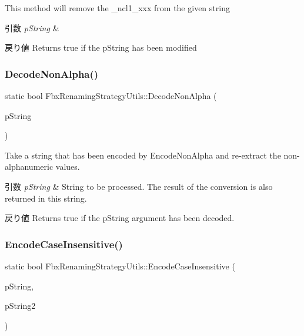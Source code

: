 This method will remove the \+\_\+ncl1\+\_\+xxx from the given string 
\begin{DoxyParams}{引数}
{\em p\+String} & \\
\hline
\end{DoxyParams}
\begin{DoxyReturn}{戻り値}
Returns true if the p\+String has been modified 
\end{DoxyReturn}
\mbox{\label{class_fbx_renaming_strategy_utils_a9ba422882bbd76f388037c75c06ff0e5}} 
\subsubsection{\texorpdfstring{Decode\+Non\+Alpha()}{DecodeNonAlpha()}}
{\footnotesize\ttfamily static bool Fbx\+Renaming\+Strategy\+Utils\+::\+Decode\+Non\+Alpha (\begin{DoxyParamCaption}\item[{\hyperlink{class_fbx_string}{Fbx\+String} \&}]{p\+String }\end{DoxyParamCaption})\hspace{0.3cm}{\ttfamily [static]}}

Take a string that has been encoded by Encode\+Non\+Alpha and re-\/extract the non-\/alphanumeric values. 
\begin{DoxyParams}{引数}
{\em p\+String} & String to be processed. The result of the conversion is also returned in this string. \\
\hline
\end{DoxyParams}
\begin{DoxyReturn}{戻り値}
Returns {\ttfamily true} if the {\ttfamily p\+String} argument has been decoded. 
\end{DoxyReturn}
\mbox{\label{class_fbx_renaming_strategy_utils_a8f0edabcf187fd49359f095008e38df1}} 
\subsubsection{\texorpdfstring{Encode\+Case\+Insensitive()}{EncodeCaseInsensitive()}}
{\footnotesize\ttfamily static bool Fbx\+Renaming\+Strategy\+Utils\+::\+Encode\+Case\+Insensitive (\begin{DoxyParamCaption}\item[{\hyperlink{class_fbx_string}{Fbx\+String} \&}]{p\+String,  }\item[{const \hyperlink{class_fbx_string}{Fbx\+String}}]{p\+String2 }\end{DoxyParamCaption})\hspace{0.3cm}{\ttfamily [static]}}


